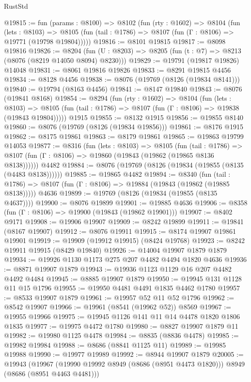 \begin{lexlean}{RustStd}
\begin{coremodule}
@19815 := fun (params : @8100) =>
  @8102
    (fun (rty : @1602) =>
    @8104
      (fun (lets : @8103) =>
      @8105 (fun (tail : @1786) => @8107 (fun (Γ : @8106) => @19771 (@19798 @19804)))))
@19816 := @8101 @19815
@19817 := @8098 @19816
@19826 := @8204
    (fun (U : @8203) => @8205 (fun (t : @7) => @8213 (@8076 (@8219 @14050 @8094) @8230)))
@19829 := @19791 (@19817 @19826) @14048
@19831 := @8061 @19816 @19826
@19833 := @8291 @19815 @4456
@19834 := @8128 @4456
@19838 := @8076 (@19769 (@8126 (@19834 @8141)))
@19840 := @19794 (@8163 @4456)
@19841 := @8147 @19840
@19843 := @8076 (@19841 @8168)
@19854 := @8294
    (fun (rty : @1602) =>
    @8104
      (fun (lets : @8103) =>
      @8105 (fun (tail : @1786) => @8107 (fun (Γ : @8106) => @19838 (@19843 @19804)))))
    @1915
@19855 := @8132 @1915
@19856 := @19855 @8140
@19860 := @8076 (@19769 (@8126 (@19834 @19856)))
@19861 := @8176 @1915
@19862 := @8175 @19861
@19863 := @8179 @19861
@19865 := @19863 @19799 @14053
@19877 := @8316
    (fun (lets : @8103) =>
    @8105
      (fun (tail : @1786) =>
      @8107 (fun (Γ : @8106) => @19860 (@19843 (@19862 (@19865 @8136 @8138))))))
    @4482
@19884 := @8076 (@19769 (@8126 (@19834 (@19855 (@8135 (@4483 @8138))))))
@19885 := @19865 @4482
@19894 := @8340
    (fun (tail : @1786) => @8107 (fun (Γ : @8106) => @19884 (@19843 (@19862 (@19885 @8138)))))
    @4636
@19899 := @19769 (@8126 (@19834 (@19855 (@8135 @4637))))
@19900 := @8076 @19899
@19901 := @19885 @4636
@19906 := @8358 (fun (Γ : @8106) => @19900 (@19843 (@19862 @19901)))
@19907 := @8402 @9171
@19908 := @19906 @19907
@19909 := @8242 @19899
@19911 := @19841 (@8167 @19907)
@19912 := @8076 @19911
@19915 := @8174 @19907 @19861 @19901
@19919 := @19909 (@19912 @19915) (@8424 @19768)
@19923 := @8242 @19911 @19915 (@8429 @19840)
@19926 := @14004 @19907 @1879 @1879
@19934 := @19926 @1130 @1173 @275 @207 @4482 @4494 @1820 @4636
@19936 := @8871 @19907 @1879
@19943 := @19936 @1123 @1129 @16 @207 @4482 @4492 @4484
@19945 := @8885 @19907 @1879
@19950 := @19945 @131 @1128 @11 @15 @1796
@19955 := @19950 @4481 @4491 @1835 @4462 @1780
@19957 := @8533 @19907 @1879
@19961 := @19957 @52 @11 @52 @1796
@19962 := @8542 @19907
@19966 := @19961 (@8541 (@19962 @52)) @8569
@19967 := @19955 @19966
@19975 := @19945 @1126 @141 @11 @14 @4478 @1820 @1806 @1835
@19977 := @19975 @4472 @1780
@19980 := @8827 @19907 @1879 @11
@19982 := @19980 @1125 @4478
@19984 := @8835 (@8836 @4478)
@19985 := @19982 @19984
@19988 := @8686 (@8841 @1125 @11)
@19989 := @19985 @19988
@19990 := @19977 @19989
@19992 := @8944 @19907 @1879
@20005 := @19943
    (@19967 (@19990 @19992 @8949 (@8686 (@8951 @4473 @1820))) @8949 (@8686 (@8951 @4463 @4481)))

\end{coremodule}
\end{lexlean}
